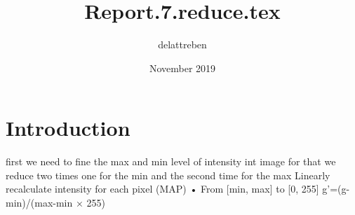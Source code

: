 \documentclass{article}
\title{Report.7.reduce.tex}
\author{delattreben }
\date{November 2019}
\begin{document}
\maketitle

\section{Introduction}
first we need to fine the max and min level of intensity int image for that we reduce two times one for the min and the second time for the max
\newline
Linearly recalculate intensity for each pixel (MAP)
• From [min, max] to [0, 255]
g'=(g-min)/(max-min × 255)
\end{document}
